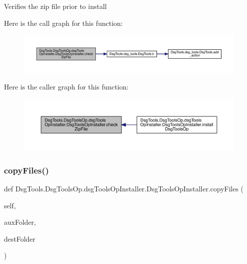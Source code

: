 \begin{DoxyVerb}Verifies the zip file prior to install
\end{DoxyVerb}
 Here is the call graph for this function\+:
\nopagebreak
\begin{figure}[H]
\begin{center}
\leavevmode
\includegraphics[width=350pt]{class_dsg_tools_1_1_dsg_tools_op_1_1dsg_tools_op_installer_1_1_dsg_tools_op_installer_a5ee6e9ff77b31248156e53f8af466c35_cgraph}
\end{center}
\end{figure}
Here is the caller graph for this function\+:
\nopagebreak
\begin{figure}[H]
\begin{center}
\leavevmode
\includegraphics[width=350pt]{class_dsg_tools_1_1_dsg_tools_op_1_1dsg_tools_op_installer_1_1_dsg_tools_op_installer_a5ee6e9ff77b31248156e53f8af466c35_icgraph}
\end{center}
\end{figure}
\mbox{\label{class_dsg_tools_1_1_dsg_tools_op_1_1dsg_tools_op_installer_1_1_dsg_tools_op_installer_a4f12609f9da8378c78343ec74dfdb682}} 
\subsubsection{\texorpdfstring{copy\+Files()}{copyFiles()}}
{\footnotesize\ttfamily def Dsg\+Tools.\+Dsg\+Tools\+Op.\+dsg\+Tools\+Op\+Installer.\+Dsg\+Tools\+Op\+Installer.\+copy\+Files (\begin{DoxyParamCaption}\item[{}]{self,  }\item[{}]{aux\+Folder,  }\item[{}]{dest\+Folder }\end{DoxyParamCaption})}

